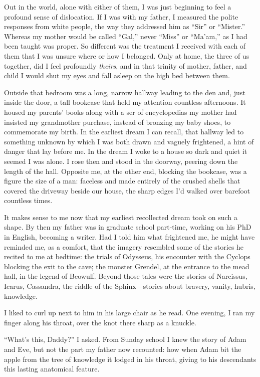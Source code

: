 Out in the world, alone with either of them, I was just beginning to
feel a profound sense of dislocation. If I was with my father, I
measured the polite responses from white people, the way they addressed
him as ``Sir'' or ``Mister.'' Whereas my mother would be called ``Gal,''
never ``Miss'' or ``Ma'am,'' as I had been taught was proper. So
different was the treatment I received with each of them that I was
unsure where or how I belonged. Only at home, the three of us together,
did I feel profoundly \emph{theirs}, and in that trinity of mother,
father, and child I would shut my eyes and fall asleep on the high bed
between them.

Outside that bedroom was a long, narrow hallway leading to the den and,
just inside the door, a tall bookcase that held my attention countless
afternoons. It housed my parents' books along with a ser of
encyclopedias my mother had insisted my grandmother purchase, instead of
bronzing my baby shoes, to commemorate my birth. In the earliest dream I
can recall, that hallway led to something unknown by which I was both
drawn and vaguely frightened, a hint of danger that lay before me. In
the dream I woke to a house so dark and quiet it seemed I was alone. I
rose then and stood in the doorway, peering down the length of the hall.
Opposite me, at the other end, blocking the bookcase, was a figure the
size of a man: faceless and made entirely of the crushed shells that
covered the driveway beside our house, the sharp edges I'd walked over
barefoot countless times.

It makes sense to me now that my earliest recollected dream took on such
a shape. By then my father was in graduate school part-time, working on
his PhD in English, becoming a writer. Had I told him what frightened
me, he might have reminded me, as a comfort, that the imagery resembled
some of the stories he recited to me at bedtime: the trials of Odysseus,
his encounter with the Cyclops blocking the exit to the cave; the
monster Grendel, at the entrance to the mead hall, in the legend of
Beowulf. Beyond those tales were the stories of Narcissus, Icarus,
Cassandra, the riddle of the Sphinx---stories about bravery, vanity,
hubris, knowledge.

I liked to curl up next to him in his large chair as he read. One
evening, I ran my finger along his throat, over the knot there sharp as
a knuckle.

``What's this, Daddy?'' I asked. From Sunday school I knew the story of
Adam and Eve, but not the part my father now recounted: how when Adam
bit the apple from the tree of knowledge it lodged in his throat, giving
to his descendants this lasting anatomical feature.

